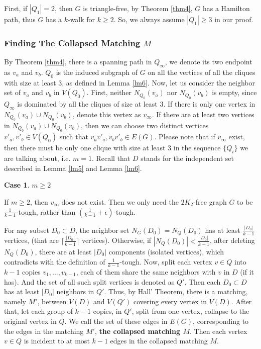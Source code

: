 \documentclass{amsart}
\newtheorem{case}{Case}
\begin{document}
First, if $|Q_1|=2$, then $G$ is triangle-free, by Theorem \ref{thm4}, $G$ has a Hamilton path, thus $G$ has a $k$-walk for $k\ge2$. So, we always assume $|Q_1|\ge3$ in our proof.

\subsubsection{Finding The Collapsed Matching $M$}
By Theorem \ref{thm4}, there is a spanning path in $Q_{\infty}$, we denote its two endpoint as $v_a$ and $v_b$. $Q_0$ is the induced subgraph of $G$ on all the vertices of all the cliques with size at least 3, as defined in Lemma \ref{lm6}. Now, let us consider the neighbor set of $v_a$ and $v_b$ in $V(Q_0)$. First, neither $N_{Q_0}(v_a)$ nor $N_{Q_0}(v_b)$ is empty, since $Q_{\infty}$ is dominated by all the cliques of size at least 3. If there is only one vertex in $N_{Q_0}(v_a)\cup N_{Q_0}(v_b)$, denote this vertex as $v_{\infty}$. If there are at least two vertices in $N_{Q_0}(v_a)\cup N_{Q_0}(v_b)$, then we can choose two distinct vertices $v'_a,v'_b\in V(Q_0)$ such that $v_av'_a,v_bv'_b\in E(G)$. Please note that if $v_{\infty}$ exist, then there must be only one clique with size at least 3 in the sequence $\{Q_i\}$ we are talking about, i.e. $m=1$.
Recall that $D$ stands for the independent set described in Lemma \ref{lm5} and Lemma \ref{lm6}. 

\begin{case}$m\ge2$\end{case}
If $m\ge2$, then $v_{\infty}$ does not exist. Then we only need the $2K_2$-free graph $G$ to be $\frac{1}{k-1}$-tough, rather than $(\frac{1}{k-1}+\epsilon)$-tough.

For any subset $D_0\subset D$, the neighbor set $N_{G}(D_0)=N_Q(D_0)$ has at least $\frac{|D_0|}{k-1}$ vertices, (that are $\lceil\frac{|D_0|}{k-1}\rceil$ vertices). Otherwise, if $|N_Q(D_0)|<\frac{|D_0|}{k-1}$, after deleting $N_Q(D_0)$, there are at least $|D_0|$ components (isolated vertices), which contradicts with the definition of $\frac{1}{k-1}$-tough. 
Now, split each vertex $v\in Q$ into $k-1$ copies $v_1,\ldots,v_{k-1}$, each of them share the same neighbors with $v$ in $D$ (if it has). And the set of all such split vertices is denoted as $Q'$.  Then each $D_0\subset D$ has at least $|D_0|$ neighbors in $Q'$.
Thus, by Hall' Theorem, there is a matching, namely $M'$, between $V(D)$ and $V(Q')$ covering every vertex in $V(D)$. 
After that, let each group of $k-1$ copies, in $Q'$, split from one vertex, collapse to the original vertex in $Q$. We call the set of these edges in $E(G)$, corresponding to the edges in the matching $M'$, {\bf the collapsed matching $M$}. Then each vertex $v\in Q$ is incident to at most $k-1$ edges in the collapsed matching $M$. 
\end{document}
